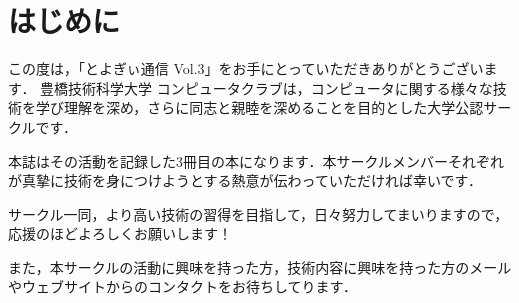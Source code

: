 \chapter{はじめに}
この度は，「とよぎぃ通信 Vol.3」をお手にとっていただきありがとうございます．
豊橋技術科学大学 コンピュータクラブは，コンピュータに関する様々な技術を学び理解を深め，さらに同志と親睦を深めることを目的とした大学公認サークルです．

本誌はその活動を記録した3冊目の本になります．本サークルメンバーそれぞれが真摯に技術を身につけようとする熱意が伝わっていただければ幸いです．

サークル一同，より高い技術の習得を目指して，日々努力してまいりますので，応援のほどよろしくお願いします！

また，本サークルの活動に興味を持った方，技術内容に興味を持った方のメールやウェブサイトからのコンタクトをお待ちしてります．
